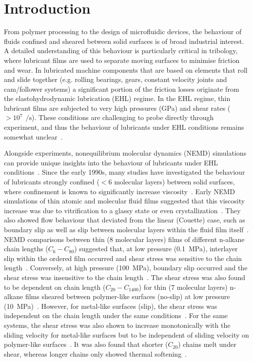 \documentclass[5p]{elsarticle}
\begin{document}
\section{Introduction}

From polymer processing to the design of microfluidic devices, the behaviour of fluids confined and sheared between solid surfaces is of broad industrial interest. A detailed understanding of this behaviour is particularly critical in tribology, where lubricant films are used to separate moving surfaces to minimise friction and wear. In lubricated machine components that are based on elements that roll and slide together (e.g. rolling bearings, gears, constant velocity joints and cam/follower systems) a significant portion of the friction losses originate from the elastohydrodynamic lubrication (EHL) regime. In the EHL regime, thin lubricant films are subjected to very high pressures (GPa) and shear rates ($> 10^{7}~\SI{}{\per\second}$). These conditions are challenging to probe directly through experiment, and thus the behaviour of lubricants under EHL conditions remains somewhat unclear~\cite{Spikes2014}.

Alongside experiments, nonequilibrium molecular dynamics (NEMD) simulations can provide unique insights into the behaviour of lubricants under EHL conditions~\cite{Ewen2018}. Since the early 1990s, many studies have investigated the behaviour of lubricants strongly confined ($< 6$ molecular layers) between solid surfaces, where confinement is known to significantly increase viscosity~\cite{Granick1991}. Early NEMD simulations of thin atomic and molecular fluid films suggested that this viscosity increase was due to vitrification to a glassy state or even crystallization~\cite{Thompson1992}. They also showed flow behaviour that deviated from the linear (Couette) case, such as boundary slip as well as slip between molecular layers within the fluid film itself~\cite{Thompson1990}. NEMD comparisons between thin (8 molecular layers) films of different n-alkane chain lengths ($C_6 - C_{80}$) suggested that, at low pressure (\SI{0.1}{\mega\pascal}), interlayer slip within the ordered film occurred and shear stress was sensitive to the chain length~\cite{Koike1998}. Conversely, at high pressure (\SI{100}{\mega\pascal}), boundary slip occurred and the shear stress was insensitive to the chain length~\cite{Koike1998}. The shear stress was also found to be dependent on chain length ($C_{20} - C_{1400}$) for thin (7 molecular layers) n-alkane films sheared between polymer-like surfaces (no-slip) at low pressure (\SI{10}{\mega\pascal})~\cite{Sivebaek2008}. However, for metal-like surfaces (slip), the shear stress was independent on the chain length under the same conditions~\cite{Sivebaek2008}. For the same systems, the shear stress was also shown to increase monotonically with the sliding velocity for metal-like surfaces but to be independent of sliding velocity on polymer-like surfaces~\cite{Sivebaek2010}. It was also found that shorter ($C_{20}$) chains melt under shear, whereas longer chains only showed thermal softening~\cite{Sivebaek2012}.
\end{document}
